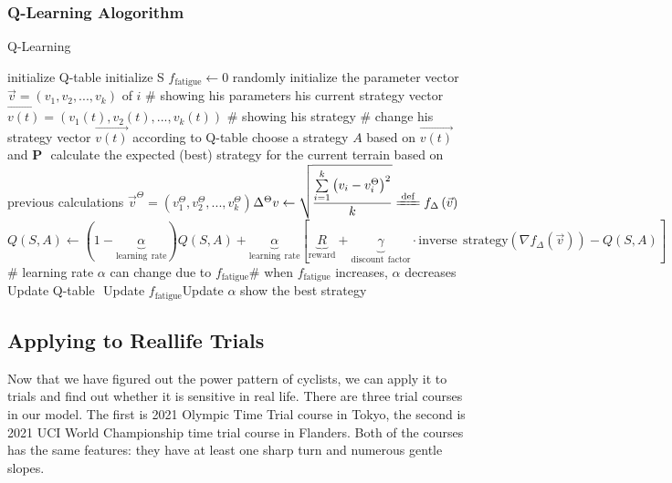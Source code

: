 \documentclass[12pt]{article}
\theoremstyle{definition}
\theoremstyle{remark}
\numberwithin{equation}{section}
\begin{document}
	\subsubsection{Q-Learning Alogorithm}
	\begin{algorithm}
		\caption{Q-Learning}
		\begin{algorithmic}
			\STATE initialize Q-table
			\STATE initialize S
			\STATE $f_{\mathrm{fatigue}}\leftarrow 0$
			\STATE randomly initialize the parameter vector $\vec{v}=\left( v_1,v_2,...,v_k \right)$ of $i$ \# showing his parameters
			\STATE his current strategy vector $\vec{v\left(t\right)}=\left( v_1\left(t\right),v_2\left(t\right),...,v_k\left(t\right) \right)$ \# showing his strategy
			\ENDFOR
			\STATE \# change his strategy vector $\vec{v\left(t\right)}$ according to Q-table
			\STATE choose a strategy \textbf{$A$} based on $\vec{v\left(t\right)}$ and \textbf{P}
	​ 		 \STATE calculate the expected (best) strategy for the current terrain based on previous calculations $\vec{v}^{\Theta}=\left( v_{1}^{\Theta},v_{2}^{\Theta},...,v_{k}^{\Theta} \right) $
	​		 \STATE $\Delta ^{\Theta}v\leftarrow \sqrt{\dfrac{\sum\limits_{i=1}^k{\left( v_i-v_{i}^{\Theta} \right) ^2}}{k}}\xlongequal{\mathrm{def}}f_{\Delta}\left( \vec{v} \right) $
	​    	 \STATE $Q(S,A)\gets (1-\underset{\mathrm{learning}\:\:\mathrm{rate}}{\underbrace{\alpha }})Q(S,A)+\underset{\mathrm{learning}\:\:\mathrm{rate}}{\underbrace{\alpha }}[\underset{\mathrm{reward}}{\underbrace{R}}+\underset{\mathrm{discount}\:\:\mathrm{factor}}{\underbrace{\gamma }}\cdot \mathrm{inverse}\:\:\mathrm{strategy}\left( \nabla f_{\Delta}\left( \vec{v} \right) \right) -Q(S,A)]$ \# learning rate $\alpha$ can change due to $f_{\mathrm{fatigue}}$
	​     	 \STATE \# when $f_{\mathrm{fatigue}}$ increases, $\alpha$ decreases
	​    	 \STATE Update Q-table
	​    	 \STATE Update $f_{\mathrm{fatigue}}$
	​    	 \STATE Update $\alpha$
			\ENDWHILE
			\STATE show the best strategy
		\end{algorithmic}
	\end{algorithm}
	\subsection{Applying to Reallife Trials}
	Now that we have figured out the power pattern of cyclists, we can apply it to trials and find out whether it is sensitive in real life. There are three trial courses in our model. The first is 2021 Olympic Time Trial course in Tokyo\cite{tokyo}, the second is 2021 UCI World Championship time trial course in Flanders\cite{UCI}. Both of the courses has the same features: they have at least one sharp turn and numerous gentle slopes.
\end{document}
